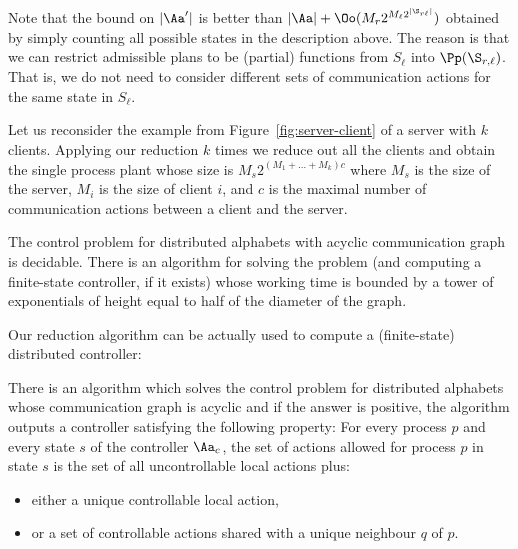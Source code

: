 \documentclass{llncs}
\begin{document}
\begin{remark} Note that the bound on $|\Aa'|$ is better than $|\Aa| +
\Oo(M_r 2^{M_\ell 2^{|\S_{r\ell}|}})$ obtained by simply counting all
possible states in the description above. 
The reason is that we can restrict admissible plans to be (partial)
functions from $S_\ell$ into $\Pp(\S_{r,\ell})$. 
That is, we do not need to consider different
sets of communication actions for the same state in $S_\ell$.
\end{remark}

Let us reconsider the example from Figure~\ref{fig:server-client} of a
server with $k$ clients. Applying our reduction $k$ times we reduce
out all the clients and obtain the single process plant whose size is
$M_s2^{(M_1+\dots +M_k)c}$ where $M_s$
is the size of the server, $M_i$ is the size of client $i$, and $c$ is
the maximal number of communication actions between a client and the
server.



\begin{theorem}\label{th:main}
  The control problem for distributed alphabets with acyclic communication
  graph is decidable. There is an algorithm for solving
  the problem (and computing a finite-state controller, if it exists) whose
  working time is bounded by a tower of exponentials of height equal
  to half of the diameter of the graph. 
\end{theorem}






Our reduction algorithm  can be actually used to compute a (finite-state)
distributed controller:

\begin{corollary}
  There is an algorithm which solves the control problem for
  distributed alphabets whose communication graph is acyclic and if
  the answer is positive, the algorithm outputs a controller
  satisfying the following property: For every process $p$ and every
  state $s$ of the controller $\Aa_c$, the set of actions allowed for
  process $p$ in state $s$ is the set of all uncontrollable local
  actions plus:
\begin{itemize}
  \item either a unique controllable local action,
  \item or a set of controllable actions shared with a unique neighbour $q$
  of $p$.
\end{itemize} 
\end{corollary}
\end{document}
